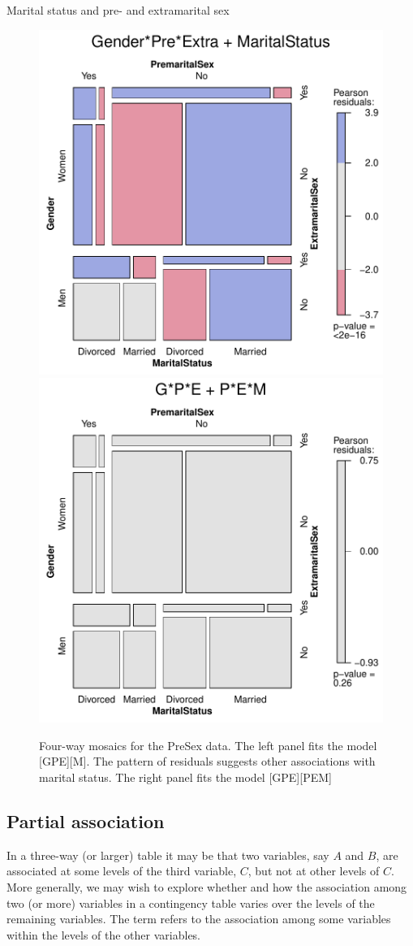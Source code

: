 \documentclass[11pt]{book}\usepackage[]{graphicx}\usepackage[]{color}
\newenvironment{knitrout}{}{} %
\renewenvironment{knitrout}{\small\renewcommand{\baselinestretch}{.85}}{} %
\begin{document}
\begin{Example}[marital1]{Marital status and pre- and extramarital sex}
\begin{knitrout}
\begin{figure}[htbp]
\centerline{\includegraphics[width=.49\textwidth]{ch05/fig/presex31} 
\includegraphics[width=.49\textwidth]{ch05/fig/presex32} }

\caption[Four-way mosaics for the PreSex data]{Four-way mosaics for the PreSex data. The left panel fits the model [GPE][M]. The pattern of residuals suggests other associations with marital status. The right panel fits the model [GPE][PEM]\label{fig:presex3}}
\end{figure}


\end{knitrout}


\end{Example}


\subsection{Partial association}\label{sec:mospart}

In a three-way (or larger) table it may be that two variables, say $A$ and $B$, are
associated at some levels of the third variable, $C$, but not at other
levels of $C$. More generally, we may wish to explore whether and how the
association among two (or more) variables in a contingency table varies over
the levels of the remaining variables. The term  refers
to the association among some variables within the levels of the other
variables.
\end{document}
